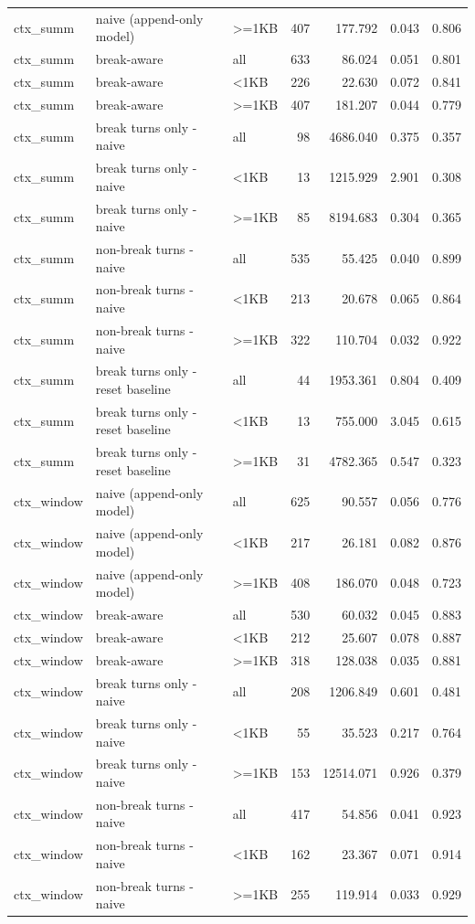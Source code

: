 \begin{table}
\begin{tabular}{lllrrrr}
ctx\_summ & naive (append-only model) & >=1KB & 407 & 177.792 & 0.043 & 0.806 \\
ctx\_summ & break-aware & all & 633 & 86.024 & 0.051 & 0.801 \\
ctx\_summ & break-aware & <1KB & 226 & 22.630 & 0.072 & 0.841 \\
ctx\_summ & break-aware & >=1KB & 407 & 181.207 & 0.044 & 0.779 \\
ctx\_summ & break turns only - naive & all & 98 & 4686.040 & 0.375 & 0.357 \\
ctx\_summ & break turns only - naive & <1KB & 13 & 1215.929 & 2.901 & 0.308 \\
ctx\_summ & break turns only - naive & >=1KB & 85 & 8194.683 & 0.304 & 0.365 \\
ctx\_summ & non-break turns - naive & all & 535 & 55.425 & 0.040 & 0.899 \\
ctx\_summ & non-break turns - naive & <1KB & 213 & 20.678 & 0.065 & 0.864 \\
ctx\_summ & non-break turns - naive & >=1KB & 322 & 110.704 & 0.032 & 0.922 \\
ctx\_summ & break turns only - reset baseline & all & 44 & 1953.361 & 0.804 & 0.409 \\
ctx\_summ & break turns only - reset baseline & <1KB & 13 & 755.000 & 3.045 & 0.615 \\
ctx\_summ & break turns only - reset baseline & >=1KB & 31 & 4782.365 & 0.547 & 0.323 \\
ctx\_window & naive (append-only model) & all & 625 & 90.557 & 0.056 & 0.776 \\
ctx\_window & naive (append-only model) & <1KB & 217 & 26.181 & 0.082 & 0.876 \\
ctx\_window & naive (append-only model) & >=1KB & 408 & 186.070 & 0.048 & 0.723 \\
ctx\_window & break-aware & all & 530 & 60.032 & 0.045 & 0.883 \\
ctx\_window & break-aware & <1KB & 212 & 25.607 & 0.078 & 0.887 \\
ctx\_window & break-aware & >=1KB & 318 & 128.038 & 0.035 & 0.881 \\
ctx\_window & break turns only - naive & all & 208 & 1206.849 & 0.601 & 0.481 \\
ctx\_window & break turns only - naive & <1KB & 55 & 35.523 & 0.217 & 0.764 \\
ctx\_window & break turns only - naive & >=1KB & 153 & 12514.071 & 0.926 & 0.379 \\
ctx\_window & non-break turns - naive & all & 417 & 54.856 & 0.041 & 0.923 \\
ctx\_window & non-break turns - naive & <1KB & 162 & 23.367 & 0.071 & 0.914 \\
ctx\_window & non-break turns - naive & >=1KB & 255 & 119.914 & 0.033 & 0.929 \\
\bottomrule
\end{tabular}
\end{table}
